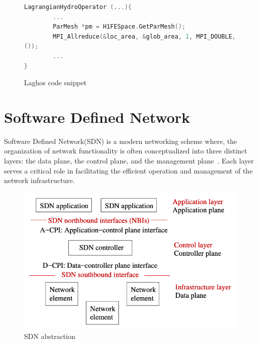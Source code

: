 \begin{figure}[H]
\begin{lstlisting}[breaklines, language=C++, frame=single, tabsize=4, basicstyle=\ttfamily]
LagrangianHydroOperator (...){
        ...
        ParMesh *pm = H1FESpace.GetParMesh();
        MPI_Allreduce(&loc_area, &glob_area, 1, MPI_DOUBLE, MPI_SUM, pm->GetComm
());
        ...
}
\end{lstlisting}
\caption{Laghos code snippet}
\label{code.laghos}
\end{figure}

\section{Software Defined Network}
Software Defined Network(SDN) is a modern networking scheme where, the organization of network functionality is often conceptualized into three distinct layers: the data plane, the control plane, and the management plane~\cite{kreutz2014software}. Each layer serves a critical role in facilitating the efficient operation and management of the network infrastructure.

\begin{figure}[h!]
  \centering
  \includegraphics[width=0.8\columnwidth]{figs/sdn.png}
  \caption{SDN abstraction }
  \label{fig:sdn_abs}
\end{figure}


